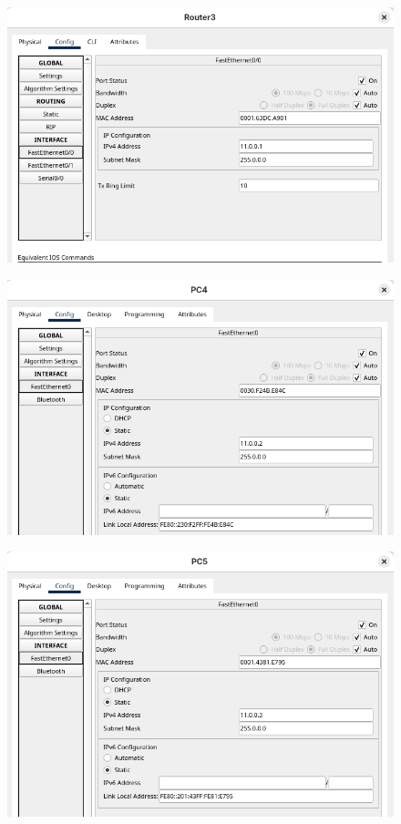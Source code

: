 \begin{figure}[h]
    \centering
    \includegraphics[width=1\textwidth]{img/18.png}
\end{figure}
\begin{figure}[h]
    \centering
    \includegraphics[width=1\textwidth]{img/19.png}
\end{figure}
\begin{figure}[h]
    \centering
    \includegraphics[width=1\textwidth]{img/20.png}
\end{figure}
